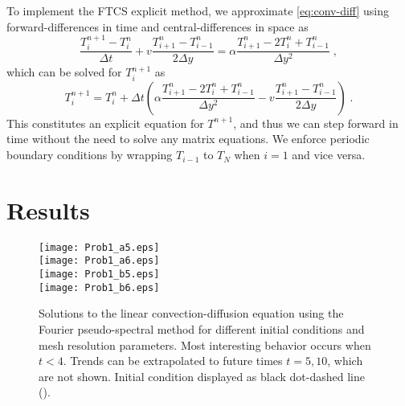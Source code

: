 \documentclass[11pt]{article}
\begin{document}
To implement the FTCS explicit method, we approximate \eqref{eq:conv-diff} using forward-differences in time and central-differences in space as
\begin{equation}
\frac{T_i^{n+1} - T_i^n}{\Delta t}
+ v \frac{T_{i+1}^n - T_{i-1}^n}{2 \Delta y}
=
\alpha \frac{T_{i+1}^n - 2 T_i^n + T_{i-1}^n}{\Delta y^2}
\;,
\end{equation}
which can be solved for $T_i^{n+1}$ as
\begin{equation}
T_i^{n+1}
=
T_i^n +
\Delta t
\left(
\alpha \frac{T_{i+1}^n - 2 T_i^n + T_{i-1}^n}{\Delta y^2}
- v \frac{T_{i+1}^n - T_{i-1}^n}{2 \Delta y}
\right)
\;.
\end{equation}
This constitutes an explicit equation for $T^{n+1}$, and thus we can step forward in time without the need to solve any matrix equations. We enforce periodic boundary conditions by wrapping $T_{i-1}$ to $T_{N}$ when $i=1$ and vice versa.

\section{Results} %

\begin{figure}[p!]
\begin{center}
\texttt{[image: Prob1\_a5.eps]} \\
\texttt{[image: Prob1\_a6.eps]} \\
\texttt{[image: Prob1\_b5.eps]} \\
\texttt{[image: Prob1\_b6.eps]}
\\[0.5cm]
\caption{Solutions to the linear convection-diffusion equation using the Fourier pseudo-spectral method for different initial conditions and mesh resolution parameters. Most interesting behavior occurs when $t<4$. Trends can be extrapolated to future times $t=5, 10$, which are not shown. Initial condition displayed as black dot-dashed line (\dotdashrule).}
\label{fig:Prob1}
\end{center}
\end{figure}
\end{document}
